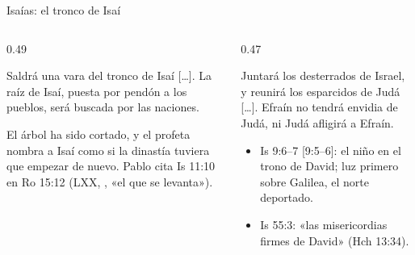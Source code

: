 \begin{frame}{Isaías: el tronco de Isaí}
\begin{columns}[T,onlytextwidth]
\begin{column}{0.49\textwidth}
\par\smallskip
\begin{cita}Saldrá una vara del tronco de Isaí [\ldots]. La raíz de Isaí, puesta por pendón a los pueblos, será buscada por las naciones.\end{cita}
\begin{notalam}
El árbol ha sido cortado, y el profeta nombra a Isaí como si la dinastía tuviera que empezar de nuevo. Pablo cita Is 11:10 en Ro 15:12 (LXX, , «el que se levanta»).
\end{notalam}
\end{column}
\begin{column}{0.47\textwidth}
\begin{cita}[fontupper=\scriptsize\itshape]Juntará los desterrados de Israel, y reunirá los esparcidos de Judá [\ldots]. Efraín no tendrá envidia de Judá, ni Judá afligirá a Efraín.\end{cita}
\footnotesize
\begin{itemize}
\item Is 9:6--7 [9:5--6]: el niño en el trono de David; luz primero sobre Galilea, el norte deportado.
\item Is 55:3: «las misericordias firmes de David» (Hch 13:34).
\end{itemize}
\end{column}
\end{columns}
\end{frame}

